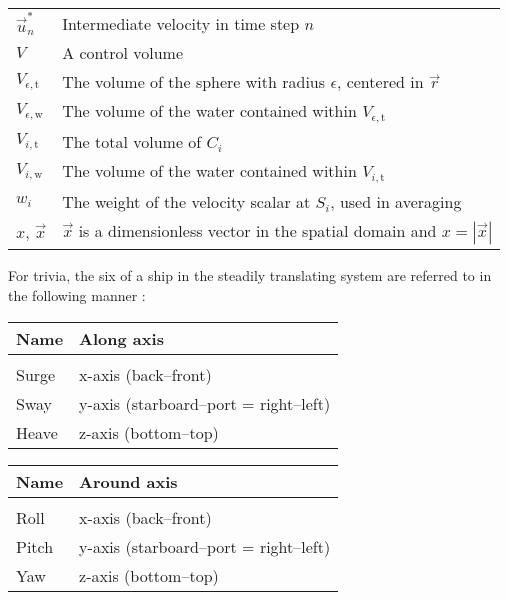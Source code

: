 {\begin{center}
\begin{longtabu}{l X}
    $\vec{u}^*_n$       & Intermediate velocity in time step $n$ \\
    $V$                 & A control volume \\
    $V_{\epsilon,\text{t}}$     & The volume of the sphere with radius $\epsilon$,
                                  centered in $\vec{r}$ \\
    $V_{\epsilon,\text{w}}$     & The volume of the water contained within $V_{\epsilon,\text{t}}$ \\
    $V_{i,\text{t}}$    & The total volume of $C_i$ \\
    $V_{i,\text{w}}$    & The volume of the water contained within $V_{i,\text{t}}$ \\
    $w_i$               & The weight of the velocity scalar at $S_i$, used in averaging \\
    $x,\,\vec{x}$       & $\vec{x}$ is a dimensionless vector in the spatial domain
                          and $x = |\vec{x}|$ \\
\end{longtabu}
\end{center}
}


\begin{center}
\tableoftaa
\end{center}




For trivia, the six \DOF of a ship in the steadily translating system are referred to in the following manner \citep{Journee2001a}:


\begin{longtabu}{l X}
    \textbf{Name} & \textbf{Along axis} \\
    \hline
    \\
    \endhead
    
	Surge & x-axis (back--front) \\
	Sway  & y-axis (starboard--port = right--left) \\
	Heave & z-axis (bottom--top) \\
\end{longtabu}


\begin{longtabu}{l X}
    \textbf{Name} & \textbf{Around axis}\\
    \hline
    \\
    \endhead
    
    Roll  & x-axis (back--front) \\
    Pitch & y-axis (starboard--port = right--left) \\
    Yaw   & z-axis (bottom--top) \\
\end{longtabu}
